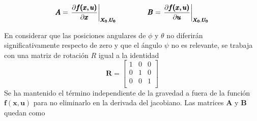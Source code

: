 \documentclass[twoside,11pt]{report}
\begin{document}
\begin{equation}
\pmb{A}=\left.{\frac{\partial \pmb{f(x,u)}}{\partial \pmb{x}}}\right\vert_{\pmb{X_0},\pmb{U_0}} \hspace*{1.5cm} \pmb{B}=\left.{\frac{\partial \pmb{f(x,u)}}{\partial \pmb{u}}}\right\vert_{\pmb{X_0},\pmb{U_0}}
\label{jacobians}
\end{equation}

En considerar que las posiciones angulares de $\phi$ y $\theta$ no diferirán significativamente respecto de zero y que el ángulo $\psi$ no es relevante, se trabaja con una matriz de rotación $R$ igual a la identidad
\begin{equation}
\pmb{R}=\left[\begin{array}{ccc}
1 & 0 & 0 \\
0 & 1 & 0 \\
0 & 0 & 1 \\ \end{array} \right]
\end{equation}
Se ha mantenido el término independiente de la gravedad a fuera de la función $\pmb{f(x,u)}$ para no eliminarlo en la derivada del jacobiano. Las matrices $\pmb{A}$ y $\pmb{B}$ quedan como
\end{document}
